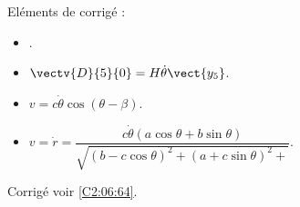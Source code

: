 \ifprof
\else
\footnotesize
Eléments de corrigé : 
\begin{itemize}
\item .
\item $\vectv{D}{5}{0} =H\dot{\theta}\vect{y_5}$.
\item $v=c\dot{\theta}\cos\left(\theta-\beta \right)$.
\item $v=\dot{r}=\dfrac{c\dot{\theta}\left(a\cos\theta+b\sin\theta\right)}{\sqrt{\left(b-c\cos\theta \right)^2+\left(a+c\sin\theta \right)^2+}}$.
\end{itemize}
\normalsize
\begin{flushright}
\footnotesize{Corrigé  voir \ref{C2:06:64}.}
\end{flushright}%
\fi